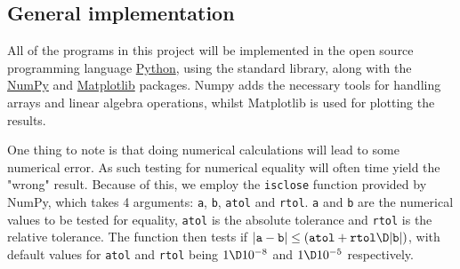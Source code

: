 \documentclass[main.tex]{subfiles}
\begin{document}
	
	
	
	\subsection{General implementation}
	All of the programs in this project will be implemented in the open source programming language \href{www.python.org}{Python}, using the standard library, along with the \href{www.numpy.org}{NumPy} and \href{www.matplotlib.org}{Matplotlib} packages. Numpy adds the necessary tools for handling arrays and linear algebra operations, whilst Matplotlib is used for plotting the results.
	
	One thing to note is that doing numerical calculations will lead to some numerical error. As such testing for numerical equality will often time yield the "wrong" result. Because of this, we employ the \texttt{isclose} function provided by NumPy, which takes 4 arguments: \texttt{a}, \texttt{b}, \texttt{atol} and \texttt{rtol}. \texttt{a} and \texttt{b} are the numerical values to be tested for equality, \texttt{atol} is the absolute tolerance and \texttt{rtol} is the relative tolerance. The function then tests if $|\texttt{a}-\texttt{b}| \leq (\texttt{atol}+ \texttt{rtol} \D |\texttt{b}|)$, with default values for \texttt{atol} and \texttt{rtol} being $ 1 \D 10^{-8} $ and $ 1 \D 10^{-5} $ respectively.
	
	
	
\end{document}
